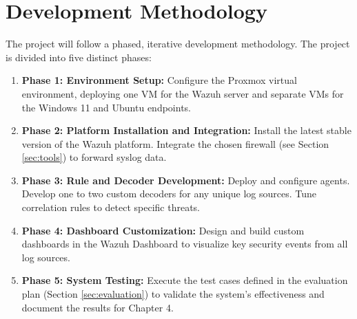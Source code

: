 \section{Development Methodology}
\label{sec:dev-methodology}
The project will follow a phased, iterative development methodology. The project is divided into five distinct phases:
\begin{enumerate}
    \item \textbf{Phase 1: Environment Setup:} Configure the Proxmox virtual environment, deploying one VM for the Wazuh server and separate VMs for the Windows 11 and Ubuntu endpoints.
    \item \textbf{Phase 2: Platform Installation and Integration:} Install the latest stable version of the Wazuh platform. Integrate the chosen firewall (see Section \ref{sec:tools}) to forward syslog data.
    \item \textbf{Phase 3: Rule and Decoder Development:} Deploy and configure agents. Develop one to two custom decoders for any unique log sources. Tune correlation rules to detect specific threats.
    \item \textbf{Phase 4: Dashboard Customization:} Design and build custom dashboards in the Wazuh Dashboard to visualize key security events from all log sources.
    \item \textbf{Phase 5: System Testing:} Execute the test cases defined in the evaluation plan (Section \ref{sec:evaluation}) to validate the system's effectiveness and document the results for Chapter 4.
\end{enumerate}


